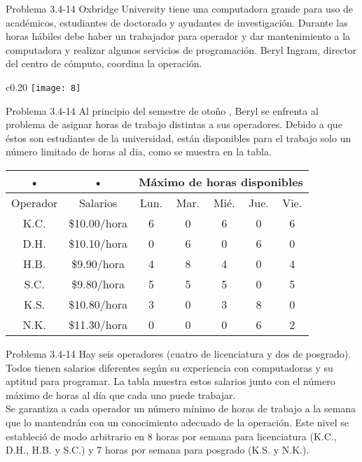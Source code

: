 \documentclass{beamer}
\begin{document}
\begin{frame}[t,fragile]{Problema 3.4-14 }
Oxbridge University tiene una computadora grande para uso de acad\'emicos, estudiantes de doctorado y ayudantes de investigaci\'on. Durante las horas h\'abiles debe haber un trabajador para operador y dar mantenimiento a la computadora y realizar algunos servicios  de programaci\'on. Beryl Ingram, director del centro de c\'omputo, coordina la operaci\'on.
\begin{wrapfigure}{c}{0.20\textwidth}
    \centering
    \texttt{[image: 8]}
\end{wrapfigure}
\end{frame}
\begin{frame}[t,fragile]{Problema 3.4-14 }
Al principio del semestre de  otoño , Beryl se enfrenta al problema de asignar horas de trabajo distintas a sus operadores. Debido a que \'estos son estudiantes de la universidad, est\'an disponibles para el trabajo solo un n\'umero limitado de horas al dia, como se muestra en la tabla. \\

\begin{tabular}{|c|c|c|c|c|c|c|}
\hline 
• & • & \multicolumn{5}{c|}{M\'aximo de horas disponibles} \\ 
\hline 
Operador & Salarios & Lun. & Mar. & Mi\'e. & Jue. & Vie. \\ 
\hline 
K.C. & \$10.00/hora & 6 & 0 & 6 & 0 & 6 \\ 
\hline 
D.H. & \$10.10/hora & 0 & 6 & 0 & 6 & 0 \\ 
\hline 
H.B. & \$9.90/hora & 4 & 8 & 4 & 0 & 4 \\ 
\hline 
S.C. & \$9.80/hora & 5 & 5 & 5 & 0 & 5 \\ 
\hline 
K.S. & \$10.80/hora & 3 & 0 & 3 & 8 & 0 \\ 
\hline 
N.K. & \$11.30/hora & 0 & 0 & 0 & 6 & 2 \\ 
\hline 
\end{tabular} 
\end{frame}
\begin{frame}[t,fragile]{Problema 3.4-14 }
Hay seis operadores (cuatro de licenciatura y dos de posgrado). Todos tienen salarios diferentes seg\'un su experiencia con computadoras y su aptitud para programar. La tabla muestra estos salarios junto con el n\'umero m\'aximo de horas al d\'ia que cada uno puede trabajar.\\
Se garantiza a cada operador un n\'umero m\'inimo de horas de trabajo a la semana que lo mantendr\'an con un conocimiento adecuado de la operaci\'on. Este nivel se estableci\'o de modo arbitrario en 8 horas por semana para licenciatura (K.C., D.H., H.B. y S.C.) y 7 horas por semana para posgrado (K.S. y N.K.).\\
\end{frame}
\end{document}
